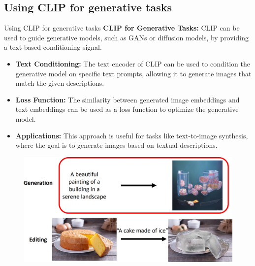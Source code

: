 \subsection{Using CLIP for generative tasks}
\begin{frame}[allowframebreaks]{Using CLIP for generative tasks}
    \textbf{CLIP for Generative Tasks:} CLIP can be used to guide generative models, such as GANs or diffusion models, by providing a text-based conditioning signal.

    \begin{itemize}
        \item \textbf{Text Conditioning:} The text encoder of CLIP can be used to condition the generative model on specific text prompts, allowing it to generate images that match the given descriptions.
        \item \textbf{Loss Function:} The similarity between generated image embeddings and text embeddings can be used as a loss function to optimize the generative model.
        \item \textbf{Applications:} This approach is useful for tasks like text-to-image synthesis, where the goal is to generate images based on textual descriptions.
    \end{itemize}
\framebreak
    \begin{figure}
        \centering
        \includegraphics[width=1\textwidth,height=0.9\textheight,keepaspectratio]{images/video/slide_58_1_img.jpg}
    \end{figure}
\end{frame}